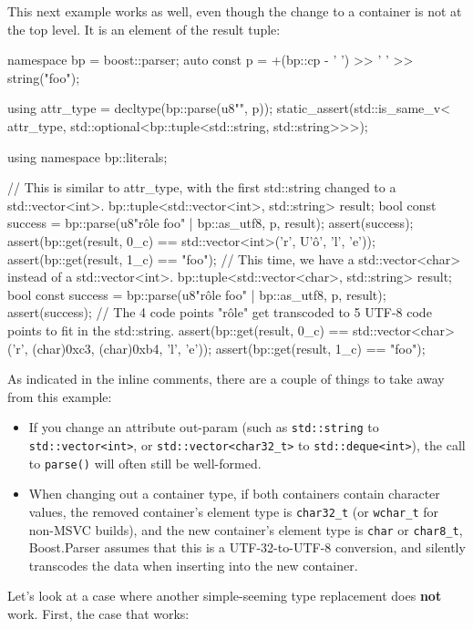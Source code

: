 This next example works as well, even though the change to a container is not at the top level. It is an element of the result tuple:

\begin{code}
namespace bp = boost::parser;
auto const p = +(bp::cp - ' ') >> ' ' >> string("foo");

using attr_type = decltype(bp::parse(u8"", p));
static_assert(std::is_same_v<
              attr_type,
              std::optional<bp::tuple<std::string, std::string>>>);

using namespace bp::literals;

{
    // This is similar to attr_type, with the first std::string changed to a std::vector<int>.
    bp::tuple<std::vector<int>, std::string> result;
    bool const success = bp::parse(u8"rôle foo" | bp::as_utf8, p, result);
    assert(success);
    assert(bp::get(result, 0_c) == std::vector<int>({'r', U'ô', 'l', 'e'}));
    assert(bp::get(result, 1_c) == "foo");
}
{
    // This time, we have a std::vector<char> instead of a std::vector<int>.
    bp::tuple<std::vector<char>, std::string> result;
    bool const success = bp::parse(u8"rôle foo" | bp::as_utf8, p, result);
    assert(success);
    // The 4 code points "rôle" get transcoded to 5 UTF-8 code points to fit in the std::string.
    assert(bp::get(result, 0_c) == std::vector<char>({'r', (char)0xc3, (char)0xb4, 'l', 'e'}));
    assert(bp::get(result, 1_c) == "foo");
}
\end{code}

As indicated in the inline comments, there are a couple of things to take away from this example:

\begin{itemize}
\item
  If you change an attribute out-param (such as \texttt{std::string} to \texttt{std::vector<int>}, or \texttt{std::vector<char32\_t>} to \texttt{std::deque<int>}), the call to \texttt{parse()} will often still be well-formed.
\item
  When changing out a container type, if both containers contain character values, the removed container's element type is \texttt{char32\_t} (or \texttt{wchar\_t} for non-MSVC builds), and the new container's element type is \texttt{char} or \texttt{char8\_t}, Boost.Parser assumes that this is a UTF-32-to-UTF-8 conversion, and silently transcodes the data when inserting into the new container.
\end{itemize}

Let's look at a case where another simple-seeming type replacement does \textbf{not} work. First, the case that works:


